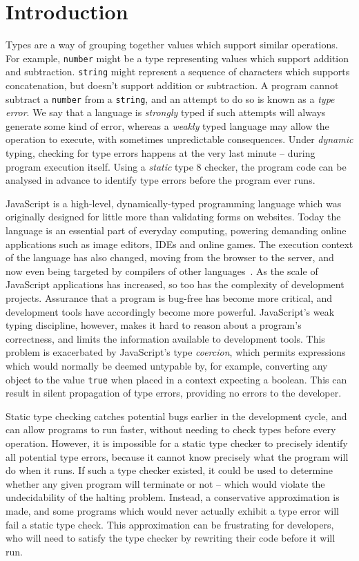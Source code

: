 \documentclass[12pt,a4paper,twoside,openright]{report}
\newcommand*{\js}{\texttt}
\begin{document}
\chapter{Introduction}\label{introduction}

Types are a way of grouping together values which support similar operations.
For example, \texttt{number} might be a type representing values which support
addition and subtraction. \texttt{string} might represent a sequence of
characters which supports concatenation, but doesn't support addition or
subtraction. A program cannot subtract a \texttt{number} from a
\texttt{string}, and an attempt to do so is known as a \textit{type error}. We
say that a language is \textit{strongly} typed if such attempts will always
generate some kind of error, whereas a \textit{weakly} typed language may allow
the operation to execute, with sometimes unpredictable consequences. Under
\textit{dynamic} typing, checking for type errors happens at the very last
minute -- during program execution itself. Using a \textit{static} type %
8 checker, the program code can be analysed in advance to identify type errors
before the program ever runs.

JavaScript is a high-level, dynamically-typed programming language which was
originally designed for little more than validating forms on websites. Today
the language is an essential part of everyday computing, powering demanding
online applications such as image editors, IDEs and online games. The execution
context of the language has also changed, moving from the browser to the
server, and now even being targeted by compilers of other languages~\cite{asm}.
As the scale of JavaScript applications has increased, so too has the
complexity of development projects.  Assurance that a program is bug-free has
become more critical, and development tools have accordingly become more
powerful. JavaScript's weak typing discipline, however, makes it hard to
reason about a program's correctness, and limits the information available to
development tools. This problem is exacerbated by JavaScript's type
\textit{coercion}, which permits expressions which would normally be deemed
untypable by, for example, converting any object to the value \js{true}
when placed in a context expecting a boolean. This can result in silent
propagation of type errors, providing no errors to the developer.

Static type checking catches potential bugs earlier in the development cycle,
and can allow programs to run faster, without needing to check types before
every operation. However, it is impossible for a static type checker to
precisely identify all potential type errors, because it cannot know precisely
what the program will do when it runs. If such a type checker existed, it could
be used to determine whether any given program will terminate or not -- which %
would violate the undecidability of the halting problem. Instead, a
conservative approximation is made, and some programs which would never
actually exhibit a type error will fail a static type check. This approximation
can be frustrating for developers, who will need to satisfy the type checker by
rewriting their code before it will run.
\end{document}
